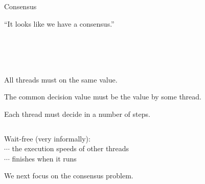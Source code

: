 \begin{frame}{}
  \centerline{\LARGE Consensus}

  \vspace{0.50cm}

  \vspace{-0.30cm} 
  \centerline{``It looks like we have a consensus.''}　
\end{frame}

\begin{frame}{}
  \begin{columns}
      \centerline{\qquad\qquad \large \bf {}}
      \centerline{\large \bf {}\qquad\qquad}
  \end{columns}

  \pause
  \vspace{0.80cm}
  \begin{definition}
    \begin{description}
      \setlength{\itemsep}{5pt}
      \item[Consistent] All  threads must  on the same value.
      \item[Validity] The common decision value must be the value  by some thread.
      \item[Wait-free] Each  thread must decide in a  number of steps.
    \end{description}
  \end{definition}
\end{frame}

\begin{frame}{}
  \begin{columns}
  \end{columns}

  \vspace{0.40cm}
  \begin{center}
    Wait-free {\footnotesize (very informally)}: \\[6pt]

    $\cdots$  the execution speeds of other threads \pause \\[8pt]

    $\cdots$  finishes when it runs 
  \end{center}
\end{frame}

\begin{frame}{}
  
  \centerline{\Large We next focus on the  consensus problem.}
\end{frame}
